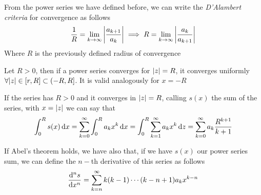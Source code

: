 \documentclass[../complete.tex]{subfiles}
\begin{document}
\begin{thm}
	From the power series we have defined before, we can write the \textit{D'Alambert criteria} for convergence as follows
	\begin{equation}
		\frac{1}{R}=\lim_{k\to\infty}\abs{\frac{a_{k+1}}{a_k}}\implies{} R=\lim_{k\to\infty}\abs{\frac{a_k}{a_{k+1}}}
		\label{eq:dalambertcriteria}
	\end{equation}
	Where $R$ is the previously defined radius of convergence
\end{thm}
\begin{thm}[Abel]
	Let $R>0$, then if a power series converges for $\abs{z}=R$, it converges uniformly $\forall\abs{z}\in[r,R]\subset(-R,R]$. It is valid analogously for $x=-R$
\end{thm}
\begin{rmk}
	If the series has $R>0$ and it converges in $\abs{z}=R$, calling $s(x)$ the sum of the series, with $x=\abs{z}$ we can say that
	\begin{equation}
		\int_{0}^{R}s(x)\operatorname{d\!} x=\sum_{k=0}^{\infty}\int_{0}^{R}a_kx^k\operatorname{d\!} x=\int_0^R\sum_{k=1}^{\infty}a_kx^k\operatorname{d\!} z=\sum_{k=0}^{\infty}a_k\frac{R^{k+1}}{k+1}
		\label{eq:abelint}
	\end{equation}
\end{rmk}
\begin{rmk}
	If Abel's theorem holds, we have also that, if we have $s(x)$ our power series sum, we can define the $n-$th derivative of this series as follows
	\begin{equation}
		\derivative[n]{s}{x}=\sum_{k=n}^{\infty}k(k-1)\cdots(k-n+1)a_kx^{k-n}
		\label{eq:nthderpowerseries}
	\end{equation}
\end{rmk}
\end{document}
